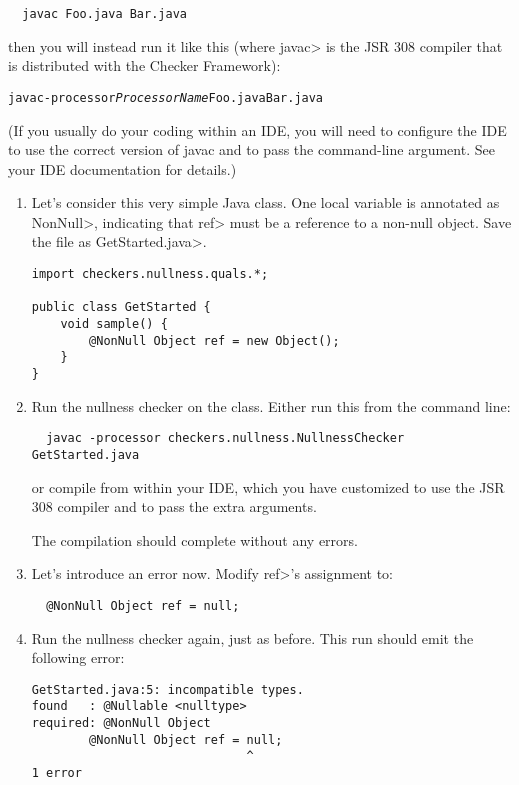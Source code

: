 \begin{Verbatim}
  javac Foo.java Bar.java
\end{Verbatim}

\noindent
then you will instead run it like this (where \<javac> is the JSR 308
compiler that is distributed with the Checker Framework):

\begin{alltt}
  javac -processor \textit{ProcessorName} Foo.java Bar.java
\end{alltt}

\noindent
(If you usually do your coding within an IDE, you will need to configure
the IDE to use the correct version of javac and to pass the command-line
argument.  See your IDE documentation for details.)

\begin{enumerate}
\item
  Let's consider this very simple Java class.  One local variable is
  annotated as \<NonNull>, indicating that \<ref> must be a reference to a
  non-null object.  Save the file as \<GetStarted.java>.

\begin{Verbatim}
import checkers.nullness.quals.*;

public class GetStarted {
    void sample() {
        @NonNull Object ref = new Object();
    }
}
\end{Verbatim}

\item
  Run the nullness checker on the class.  Either run this from the command line:

\begin{Verbatim}
  javac -processor checkers.nullness.NullnessChecker GetStarted.java
\end{Verbatim}

\noindent
or compile from within your IDE, which you have customized to use the JSR
308 compiler and to pass the extra arguments.

  The compilation should complete without any errors.

\item
  Let's introduce an error now.  Modify \<ref>'s assignment to:
\begin{Verbatim}
  @NonNull Object ref = null;
\end{Verbatim}

\item
  Run the nullness checker again, just as before.  This run should emit
  the following error:
\begin{Verbatim}
GetStarted.java:5: incompatible types.
found   : @Nullable <nulltype>
required: @NonNull Object
		@NonNull Object ref = null;
		                      ^
1 error
\end{Verbatim}


\end{enumerate}

